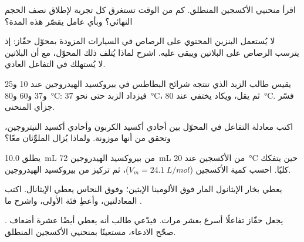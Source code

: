 \begin{exercise}[$\star\star$]\label{exo:g12:catalysis:7}
اقرأ منحنيي الأكسجين المنطلق. كم من الوقت تستغرق كل تجربة
لإطلاق نصف الحجم النهائي؟ وبأي عامل يقصّر
 هذه المدة؟
\end{exercise}

\begin{exercise}[$\star\star$]\label{exo:g12:catalysis:8}
لا يُستعمل البنزين المحتوي على الرصاص في السيارات المزودة بمحوّل حفّاز: إذ
يترسب الرصاص على البلاتين ويبقى عليه. اشرح لماذا يُتلف ذلك
المحوّل، مع أن البلاتين لا يُستهلك في التفاعل العادي.
\end{exercise}

\begin{exercise}[$\star\star$]\label{exo:g12:catalysis:9}
يقيس طالب الزبد الذي تنتجه شرائح البطاطس في بيروكسيد
الهيدروجين عند 10 و25 و37 و60 و\qty{80}{\celsius}: فيزداد الزبد حتى
نحو \qty{37}{\celsius}، ثم يقل، ويكاد يختفي عند
\qty{80}{\celsius}. فسّر جزأي المنحنى.
\end{exercise}

\begin{exercise}[$\star\star$]\label{exo:g12:catalysis:10}
اكتب معادلة التفاعل في المحوّل  بين
أحادي أكسيد الكربون وأحادي أكسيد النيتروجين، وتحقق من أنها موزونة.
ولماذا يُزال الملوِّثان معًا؟
\end{exercise}

\begin{exercise}[$\star\star$]\label{exo:g12:catalysis:11}
يطلق \qty{10.0}{mL} من  بيروكسيد الهيدروجين \qty{72}{mL} من
الأكسجين عند \qty{20}{\celsius} حين يتفكك كليًا. احسب
كمية الأكسجين ($V_m = \qty{24.1}{L/mol}$)، ثم تركيز
 من بيروكسيد الهيدروجين.
\end{exercise}

\begin{exercise}[$\star\star\star$]\label{exo:g12:catalysis:12}
يعطي بخار الإيثانول المار فوق الألومينا الإيثين؛ وفوق النحاس يعطي
الإيثانال. اكتب المعادلتين، وأعطِ فئة الأولى،
واشرح ما .
\end{exercise}

\begin{exercise}[$\star\star\star$]\label{exo:g12:catalysis:13}
يجعل حفّاز تفاعلًا أسرع بعشر مرات. فيدّعي طالب أنه يعطي أيضًا
عشرة أضعاف . صحّح الادعاء، مستعينًا بمنحنيي
الأكسجين المنطلق.
\end{exercise}

